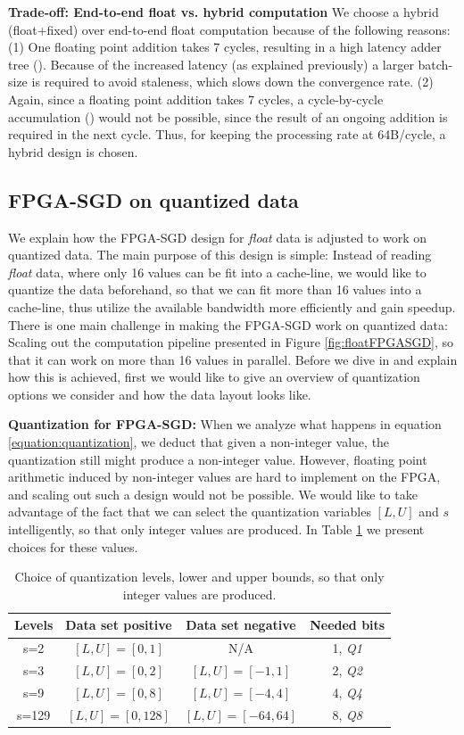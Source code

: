 \documentclass{article}
\newcommand*\circled[1]{\tikz[baseline=(char.base)]{
\node[shape=circle,draw,color=black,text=black,inner sep=0.05pt](char){#1};}}
\begin{document}
\noindent
\textbf{Trade-off: End-to-end float vs. hybrid computation} We choose a hybrid (float+fixed) over end-to-end float computation because of the following reasons: (1) One floating point addition takes 7 cycles, resulting in a high latency adder tree (\circled{3}). Because of the increased latency (as explained previously) a larger batch-size is required to avoid staleness, which slows down the convergence rate. (2) Again, since a floating point addition takes 7 cycles, a cycle-by-cycle accumulation (\circled{7}) would not be possible, since the result of an ongoing addition is required in the next cycle. Thus, for keeping the processing rate at 64B/cycle, a hybrid design is chosen.

\subsection{FPGA-SGD on \textbf{quantized} data}
\label{section:qfpgasgd}

We explain how the FPGA-SGD design for \textit{float} data is adjusted to work on quantized data. The main purpose of this design is simple: Instead of reading \textit{float} data, where only 16 values can be fit into a cache-line, we would like to quantize the data beforehand, so that we can fit more than 16 values into a cache-line, thus utilize the available bandwidth more efficiently and gain speedup. There is one main challenge in making the FPGA-SGD work on quantized data: Scaling out the computation pipeline presented in Figure \ref{fig:floatFPGASGD}, so that it can work on more than 16 values in parallel. Before we dive in and explain how this is achieved, first we would like to give an overview of quantization options we consider and how the data layout looks like.

\noindent
\textbf{Quantization for FPGA-SGD:} When we analyze what happens in equation \eqref{equation:quantization}, we deduct that given a non-integer value, the quantization still might produce a non-integer value. However, floating point arithmetic induced by non-integer values are hard to implement on the FPGA, and scaling out such a design would not be possible. We would like to take advantage of the fact that we can select the quantization variables $[L,U]$ and $s$ intelligently, so that only integer values are produced. In Table \ref{table:quantization} we present choices for these values.

\begin{table}[t]
\centering
\caption{Choice of quantization levels, lower and upper bounds, so that only integer values are produced.}
\label{table:quantization}
\begin{tabular}{c|c|c|c}
Levels & Data set positive & Data set negative & Needed bits\\
\hline
s=2 & $[L,U]=[0,1]$ & N/A & 1, \textit{Q1} \\
s=3 & $[L,U]=[0,2]$ & $[L,U]=[-1,1]$ & 2, \textit{Q2} \\
s=9 & $[L,U]=[0,8]$ & $[L,U]=[-4,4]$ & 4, \textit{Q4} \\
s=129 & $[L,U]=[0,128]$ & $[L,U]=[-64,64]$ & 8, \textit{Q8}
\end{tabular}
\end{table}
\end{document}
